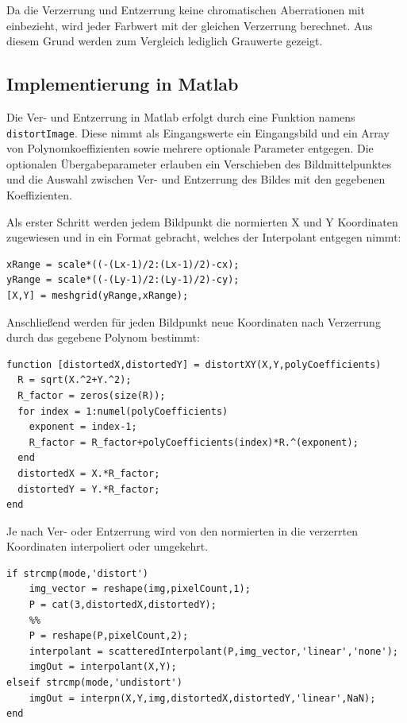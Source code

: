 Da die Verzerrung und Entzerrung keine chromatischen Aberrationen mit einbezieht, wird jeder Farbwert %
 mit der gleichen Verzerrung berechnet. Aus diesem Grund werden zum Vergleich lediglich Grauwerte gezeigt.

\subsection{Implementierung in Matlab}
Die Ver- und Entzerrung in Matlab erfolgt durch eine Funktion namens \texttt{distortImage}. Diese nimmt als Eingangswerte ein Eingangsbild und ein Array von Polynomkoeffizienten sowie mehrere optionale Parameter entgegen. Die optionalen Übergabeparameter erlauben ein Verschieben des Bildmittelpunktes und die Auswahl zwischen Ver- und Entzerrung des Bildes mit den gegebenen Koeffizienten. 

Als erster Schritt werden jedem Bildpunkt die normierten X und Y Koordinaten zugewiesen und in ein Format gebracht, welches der Interpolant entgegen nimmt:
\begin{lstlisting}[style=Matlab-editor,basicstyle=\mlttfamily]
%% Bestimmung der normierten X und Y-Koordinaten mit Center-Offset
xRange = scale*((-(Lx-1)/2:(Lx-1)/2)-cx);
yRange = scale*((-(Ly-1)/2:(Ly-1)/2)-cy);
[X,Y] = meshgrid(yRange,xRange);

\end{lstlisting}

Anschließend werden für jeden Bildpunkt neue Koordinaten nach Verzerrung durch das gegebene Polynom bestimmt:

\begin{lstlisting}[style=Matlab-editor,basicstyle=\mlttfamily]
%% Berechne das Verzerrungspolynom und verzerrte XY Coordinaten
function [distortedX,distortedY] = distortXY(X,Y,polyCoefficients)
  R = sqrt(X.^2+Y.^2);
  R_factor = zeros(size(R));
  for index = 1:numel(polyCoefficients)
    exponent = index-1;
    R_factor = R_factor+polyCoefficients(index)*R.^(exponent);
  end
  distortedX = X.*R_factor;
  distortedY = Y.*R_factor;
end
\end{lstlisting}

Je nach Ver- oder Entzerrung wird von den normierten in die verzerrten Koordinaten interpoliert oder umgekehrt.
\begin{lstlisting}[style=Matlab-editor,basicstyle=\mlttfamily]
%% Berechnung der X,Y Position nach Ver/Entzerrung
if strcmp(mode,'distort')
	img_vector = reshape(img,pixelCount,1);
	P = cat(3,distortedX,distortedY);
	%%
	P = reshape(P,pixelCount,2);
	interpolant = scatteredInterpolant(P,img_vector,'linear','none');
	imgOut = interpolant(X,Y);
elseif strcmp(mode,'undistort')
	imgOut = interpn(X,Y,img,distortedX,distortedY,'linear',NaN);
end
\end{lstlisting}


